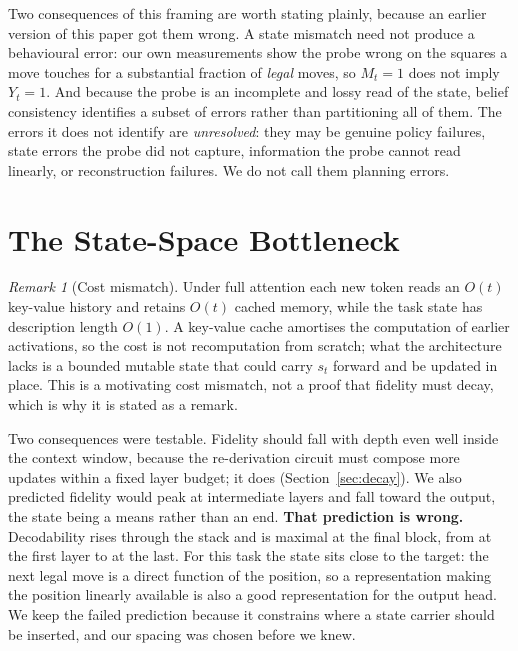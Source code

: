 \documentclass[11pt]{article}
\theoremstyle{remark}
\newtheorem{remark}{Remark}
\begin{document}
Two consequences of this framing are worth stating plainly, because an earlier
version of this paper got them wrong. A state mismatch need not produce a
behavioural error: our own measurements show the probe wrong on the squares a
move touches for a substantial fraction of \emph{legal} moves, so
$M_t{=}1$ does not imply $Y_t{=}1$. And because the probe is an incomplete and
lossy read of the state, belief consistency identifies a subset of errors rather
than partitioning all of them. The errors it does not identify are
\emph{unresolved}: they may be genuine policy failures, state errors the probe
did not capture, information the probe cannot read linearly, or reconstruction
failures. We do not call them planning errors.

\section{The State-Space Bottleneck}
\label{sec:bottleneck}

\begin{remark}[Cost mismatch]
Under full attention each new token reads an $O(t)$ key-value history and
retains $O(t)$ cached memory, while the task state has description length
$O(1)$. A key-value cache amortises the computation of earlier activations, so
the cost is not recomputation from scratch; what the architecture lacks is a
bounded mutable state that could carry $s_t$ forward and be updated in place.
This is a motivating cost mismatch, not a proof that fidelity must decay, which
is why it is stated as a remark.
\end{remark}

Two consequences were testable. Fidelity should fall with depth even well inside
the context window, because the re-derivation circuit must compose more updates
within a fixed layer budget; it does (Section~\ref{sec:decay}). We also predicted
fidelity would peak at intermediate layers and fall toward the output, the state
being a means rather than an end. \textbf{That prediction is wrong.} Decodability
rises through the stack and is maximal at the final block, from
 at the first layer to  at the last.
For this task the state sits close to the target: the next legal move is a direct
function of the position, so a representation making the position linearly
available is also a good representation for the output head. We keep the failed
prediction because it constrains where a state carrier should be inserted, and
our spacing was chosen before we knew.
\end{document}
